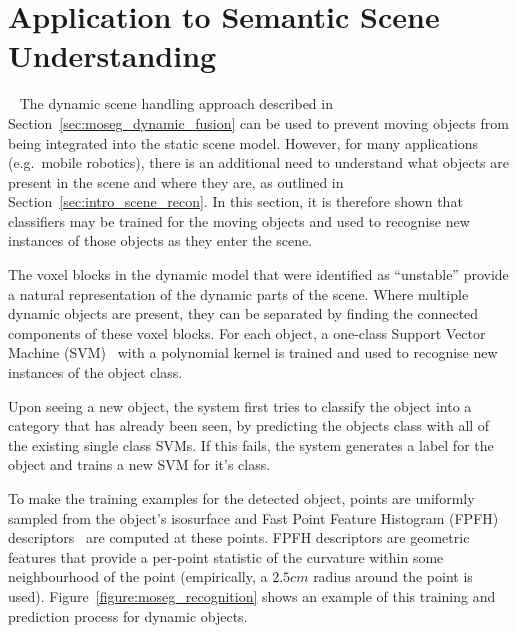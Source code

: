 \section{Application to Semantic Scene Understanding}
~\label{sec:moseg_semantic}
The dynamic scene handling approach described in Section~\ref{sec:moseg_dynamic_fusion}
can be used to prevent moving objects from being integrated into the static
scene model. However, for many applications (e.g.\ mobile robotics), there is an
additional need to understand what objects are present in the scene and where
they are, as outlined in Section~\ref{sec:intro_scene_recon}. In this section, it is 
therefore shown that classifiers may be trained for the moving objects and used to recognise 
new instances of those objects as they enter the scene.

The voxel blocks in the dynamic model that were identified as ``unstable''
provide a natural representation of the dynamic parts of the scene. Where
multiple dynamic objects are present, they can be separated by finding the
connected components of these voxel blocks. For each object, a one-class Support
Vector Machine (SVM)~\cite{Singer07} with a polynomial kernel is trained and used 
to recognise new instances of the object class.

Upon seeing a new object, the system first tries to classify the object into a category
that has already been seen, by predicting the objects class with all of the existing single class 
SVMs. If this fails, the system generates a label for the object and trains a new SVM for it's 
class. 

To make the training examples for the detected object, points are uniformly sampled from the object's
isosurface and Fast Point Feature Histogram (FPFH) descriptors~\cite{Rusu2009} are computed
at these points. FPFH descriptors are geometric features that provide a
per-point statistic of the curvature within some neighbourhood of the point
(empirically, a \(2.5cm\) radius around the point is used). Figure~\ref{figure:moseg_recognition} 
shows an example of this training and prediction process for dynamic objects.

